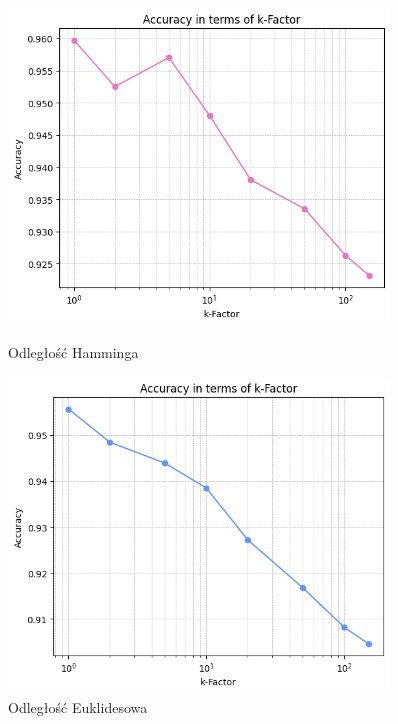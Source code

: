 \documentclass[polish,12pt,a4paper]{extarticle}
\begin{document}
\begin{figure}[h!]
    \centering
    \begin{minipage}[b]{0.48\textwidth}
    \includegraphics[width=0.9\textwidth]{img/hamming.png}
    \caption{Odległość Hamminga}
    \end{minipage}
     \hspace{0.02\textwidth}
    \begin{minipage}[b]{0.48\textwidth}
    \includegraphics[width=0.9\textwidth]{img/euclidean.png}
    \caption{Odległość Euklidesowa}
    \end{minipage}
\end{figure}
\FloatBarrier
\end{document}
